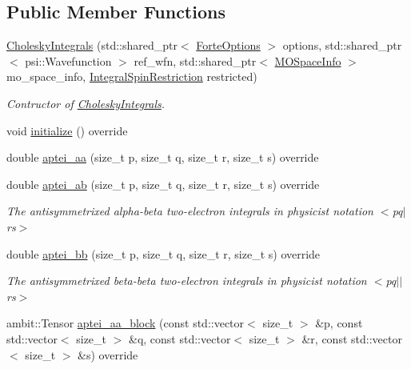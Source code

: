 \subsection*{Public Member Functions}
\begin{DoxyCompactItemize}
\item 
\mbox{\hyperlink{classforte_1_1_cholesky_integrals_af2bc409104a885004f8dd216c5b2465b}{Cholesky\+Integrals}} (std\+::shared\+\_\+ptr$<$ \mbox{\hyperlink{classforte_1_1_forte_options}{Forte\+Options}} $>$ options, std\+::shared\+\_\+ptr$<$ psi\+::\+Wavefunction $>$ ref\+\_\+wfn, std\+::shared\+\_\+ptr$<$ \mbox{\hyperlink{classforte_1_1_m_o_space_info}{M\+O\+Space\+Info}} $>$ mo\+\_\+space\+\_\+info, \mbox{\hyperlink{namespaceforte_a7defa2660dd3eb07aa81176b90781be7}{Integral\+Spin\+Restriction}} restricted)
\begin{DoxyCompactList}\small\item\em Contructor of \mbox{\hyperlink{classforte_1_1_cholesky_integrals}{Cholesky\+Integrals}}. \end{DoxyCompactList}\item 
void \mbox{\hyperlink{classforte_1_1_cholesky_integrals_af303c4caae64a8a7231239a676cac65e}{initialize}} () override
\item 
double \mbox{\hyperlink{classforte_1_1_cholesky_integrals_a118be3ea0020672f3d3e6ce4602cc14c}{aptei\+\_\+aa}} (size\+\_\+t p, size\+\_\+t q, size\+\_\+t r, size\+\_\+t s) override
\item 
double \mbox{\hyperlink{classforte_1_1_cholesky_integrals_aba4876388a8b9b633f38af3fc1cb4227}{aptei\+\_\+ab}} (size\+\_\+t p, size\+\_\+t q, size\+\_\+t r, size\+\_\+t s) override
\begin{DoxyCompactList}\small\item\em The antisymmetrixed alpha-\/beta two-\/electron integrals in physicist notation $<$pq$\vert$rs$>$ \end{DoxyCompactList}\item 
double \mbox{\hyperlink{classforte_1_1_cholesky_integrals_a02acd5ac863dcc1577c8b481ab80e8b6}{aptei\+\_\+bb}} (size\+\_\+t p, size\+\_\+t q, size\+\_\+t r, size\+\_\+t s) override
\begin{DoxyCompactList}\small\item\em The antisymmetrixed beta-\/beta two-\/electron integrals in physicist notation $<$pq$\vert$$\vert$rs$>$ \end{DoxyCompactList}\item 
ambit\+::\+Tensor \mbox{\hyperlink{classforte_1_1_cholesky_integrals_aeaecb1b7275f8b9fc8b87b4a3b110fcd}{aptei\+\_\+aa\+\_\+block}} (const std\+::vector$<$ size\+\_\+t $>$ \&p, const std\+::vector$<$ size\+\_\+t $>$ \&q, const std\+::vector$<$ size\+\_\+t $>$ \&r, const std\+::vector$<$ size\+\_\+t $>$ \&s) override

\end{DoxyCompactItemize}
